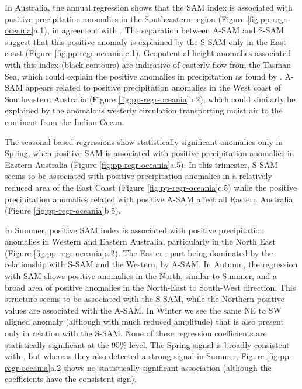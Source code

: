 \documentclass[smallextended]{svjour3}       %
\begin{document}
In Australia, the annual regression shows that the SAM index is associated with positive precipitation anomalies in the Southeastern region (Figure \ref{fig:pp-regr-oceania}a.1), in agreement with \citet{gillett2006}. The separation between A\nobreakdash-SAM and S\nobreakdash-SAM suggest that this positive anomaly is explained by the S\nobreakdash-SAM only in the East coast (Figure \ref{fig:pp-regr-oceania}c.1). Geopotential height anomalies associated with this index (black contours) are indicative of easterly flow from the Tasman Sea, which could explain the positive anomalies in precipitation as found by \citet{hendon2007}. A\nobreakdash-SAM appears related to positive precipitation anomalies in the West coast of Southeastern Australia (Figure \ref{fig:pp-regr-oceania}b.2), which could similarly be explained by the anomalous westerly circulation transporting moist air to the continent from the Indian Ocean.

The seasonal-based regressions show statistically significant anomalies only in Spring, when positive SAM is associated with positive precipitation anomalies in Eastern Australia (Figure \ref{fig:pp-regr-oceania}a.5). In this trimester, S\nobreakdash-SAM seems to be associated with positive precipitation anomalies in a relatively reduced area of the East Coast (Figure \ref{fig:pp-regr-oceania}c.5) while the positive precipitation anomalies related with positive A\nobreakdash-SAM affect all Eastern Australia (Figure \ref{fig:pp-regr-oceania}b.5).

In Summer, positive SAM index is associated with positive precipitation anomalies in Western and Eastern Australia, particularly in the North East (Figure \ref{fig:pp-regr-oceania}a.2). The Eastern part being dominated by the relationship with S\nobreakdash-SAM and the Western, by A\nobreakdash-SAM. In Autumn, the regression with SAM shows positive anomalies in the North, similar to Summer, and a broad area of positive anomalies in the North-East to South-West direction. This structure seems to be associated with the S\nobreakdash-SAM, while the Northern positive values are associated with the A\nobreakdash-SAM. In Winter we see the same NE to SW aligned anomaly (although with much reduced amplitude) that is also present only in relation with the S\nobreakdash-SAM. None of these regression coefficients are statistically significant at the 95\% level. The Spring signal is broadly consistent with \citet{hendon2007}, but whereas they also detected a strong signal in Summer, Figure \ref{fig:pp-regr-oceania}a.2 shows no statistically significant association (although the coefficients have the consistent sign).
\end{document}

